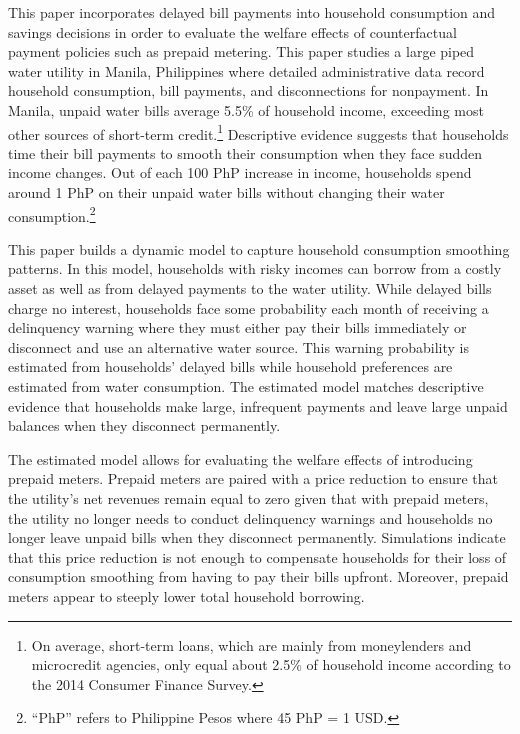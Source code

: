 \documentclass[12pt,table]{article}
\begin{document}
This paper incorporates delayed bill payments into household consumption and savings decisions in order to evaluate the welfare effects of counterfactual payment policies such as prepaid metering.  This paper studies a large piped water utility in Manila, Philippines where detailed administrative data record household consumption, bill payments, and disconnections for nonpayment.  In Manila, unpaid water bills average 5.5\% of household income, exceeding most other sources of short-term credit.\footnote{On average, short-term loans, which are mainly from moneylenders and microcredit agencies, only equal about 2.5\% of household income according to the 2014 Consumer Finance Survey.}  Descriptive evidence suggests that households time their bill payments to smooth their consumption when they face sudden income changes.  Out of each 100 PhP increase in income, households spend around 1 PhP on their unpaid water bills without changing their water consumption.\footnote{``PhP'' refers to Philippine Pesos where 45 PhP = 1 USD.}

This paper builds a dynamic model to capture household consumption smoothing patterns.  In this model, households with risky incomes can borrow from a costly asset as well as from delayed payments to the water utility.  While delayed bills charge no interest, households face some probability each month of receiving a delinquency warning where they must either pay their bills immediately or disconnect and use an alternative water source.  This warning probability is estimated from households' delayed bills while household preferences are estimated from water consumption.  The estimated model matches descriptive evidence that households make large, infrequent payments and leave large unpaid balances when they disconnect permanently.

The estimated model allows for evaluating the welfare effects of introducing prepaid meters.  Prepaid meters are paired with a price reduction to ensure that the utility's net revenues remain equal to zero given that with prepaid meters, the utility no longer needs to conduct delinquency warnings and households no longer leave unpaid bills when they disconnect permanently.  Simulations indicate that this price reduction is not enough to compensate households for their loss of consumption smoothing from having to pay their bills upfront.  Moreover, prepaid meters appear to steeply lower total household borrowing.
\end{document}
